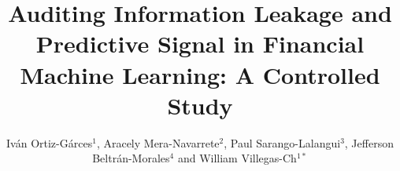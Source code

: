 \documentclass[utf8]{FrontiersinHarvard} %
\def\firstAuthorLast{Villegas-Ch {et~al.}} %
\def\Authors{Iván Ortiz-Gárces$^{1}$, Aracely Mera-Navarrete$^{2}$, Paul Sarango-Lalangui$^{3}$, Jefferson Beltrán-Morales$^{4}$ and William Villegas-Ch$^{1*}$}
\begin{document}
\onecolumn
{}

\title[Information Leakage and Predictive Signal Audit]{Auditing Information Leakage and Predictive Signal in Financial Machine Learning: A Controlled Study} 

\author[\firstAuthorLast ]{\Authors} %
\address{} %
\correspondance{} %

\extraAuth{}%


\maketitle
\end{document}
